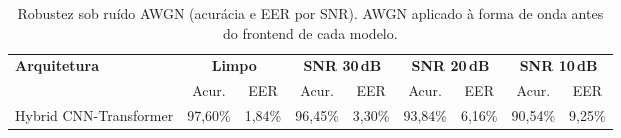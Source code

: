 \begin{table}[H]
\centering
\caption{Robustez sob ruído AWGN (acurácia e EER por SNR). AWGN aplicado à forma de onda antes do frontend de cada modelo.}
\label{tab:bench_robustez}
\small\singlespacing
\begin{tabular}{lcccccccc}
\toprule
\multirow{2}{*}{\textbf{Arquitetura}} & \multicolumn{2}{c}{\textbf{Limpo}} & \multicolumn{2}{c}{\textbf{SNR 30\,dB}} & \multicolumn{2}{c}{\textbf{SNR 20\,dB}} & \multicolumn{2}{c}{\textbf{SNR 10\,dB}} \\
\cmidrule(lr){2-3}\cmidrule(lr){4-5}\cmidrule(lr){6-7}\cmidrule(lr){8-9}
 & Acur. & EER & Acur. & EER & Acur. & EER & Acur. & EER \\
\midrule
Hybrid CNN-Transformer & 97,60\% & 1,84\% & 96,45\% & 3,30\% & 93,84\% & 6,16\% & 90,54\% & 9,25\% \\
\bottomrule
\end{tabular}
\end{table}
